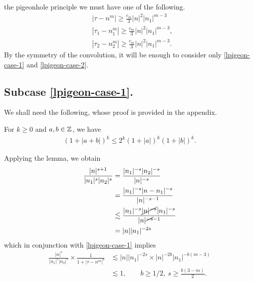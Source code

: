 the pigeonhole principle we must have one of the 
following.
%
%
\begin{align}
	\label{lpigeon-case-1}
	& |\tau - n^{m }| \ge \frac{c_m}{3} |n|^2 | n_1 |^{m-3} 		\\
		\label{lpigeon-case-2}
	    & | \tau_1 - n_1^{m } | \ge \frac{c_m}{3} |n|^2 | n_1 |^{m-3} ,  
		\\
		\label{lpigeon-case-3}
		& | \tau_2 - n_2^{m } | \ge
		\frac{c_m}{3} |n|^2 | n_1 |^{m-3}.  
\end{align}
%
%
By the symmetry of the convolution, it will be enough to consider only
\eqref{lpigeon-case-1} and \eqref{lpigeon-case-2}.
%
%
%
\subsection{Subcase \ref{lpigeon-case-1}.} 
We shall need the following, whose proof is provided in the appendix.
%
%
\begin{lemma}
\label{llem:splitting}
	For $k \ge 0$ and $a, b \in {\mathbb{Z}}$, we have
%
%
\begin{equation}
	\label{lsplitting}
	\begin{split}
		\left ( 1 + |a +b | \right)^k \le 2^k \left(1 + | a | \right)^k \left(
		1 + | b | \right)^k.
	\end{split}
\end{equation}
%
%
\end{lemma}
%
Applying the lemma, we obtain
%
%
%
\begin{equation*}
	\begin{split}
		\frac{|n|^{s+1}}{|n_1|^s | n_2|^s } 
		& =\frac{|n_1|^{-s} |n_2|^{-s}
		}{|n|^{-s}}
		\\
		& = \frac{| n_1|^{-s} | n - n_1 |^{-s} }{ | n|^{-s-1}} 
		\\
		& \lesssim \frac{|n_1|^{-s} \cancel{|n|^{-s} }|n_1 |
		^{-s}}{ |n|
		^{\cancel{-s}-1}}
		\\
		& = |n| | n_1 |^{-2s}
	\end{split}
\end{equation*}
%
which in conjunction with \eqref{lpigeon-case-1} implies
%
\begin{equation}
	\label{lconvo-deriv-bound}
	\begin{split}
		\frac{|n|^s}{|n_1|^s 
		| n_2|^s}
		\times
		\frac{1}{1 + | \tau -n^{m} |^{b}}
		& \lesssim  |n| |n_{1} |^{-2s} \times |n|^{-2b} |n_{1}|^{-b(m-3)} 
		\\
		& \lesssim 1, \qquad b\ge 1/2, \ s \ge \frac{b(3-m)}{2}.
	\end{split}  
\end{equation}
